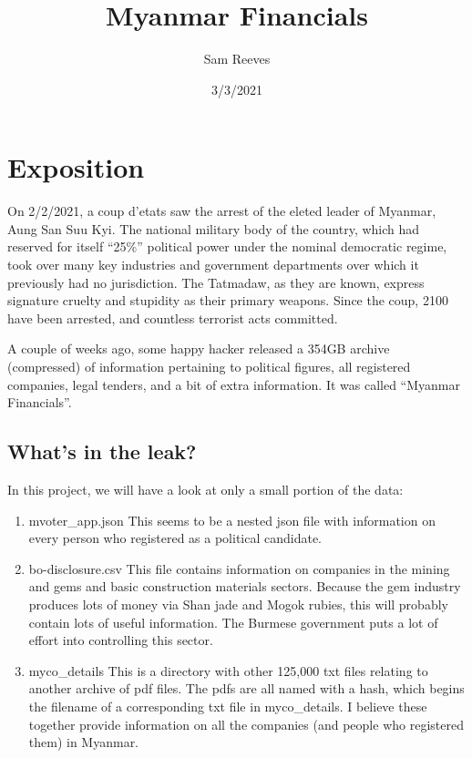 \documentclass[
]{article}
\title{Myanmar Financials}
\author{Sam Reeves}
\date{3/3/2021}
\begin{document}
\maketitle

\hypertarget{exposition}{%
\section{Exposition}\label{exposition}}

On 2/2/2021, a coup d'etats saw the arrest of the eleted leader of
Myanmar, Aung San Suu Kyi. The national military body of the country,
which had reserved for itself ``25\%'' political power under the nominal
democratic regime, took over many key industries and government
departments over which it previously had no jurisdiction. The Tatmadaw,
as they are known, express signature cruelty and stupidity as their
primary weapons. Since the coup, 2100 have been arrested, and countless
terrorist acts committed.

A couple of weeks ago, some happy hacker released a 354GB archive
(compressed) of information pertaining to political figures, all
registered companies, legal tenders, and a bit of extra information. It
was called ``Myanmar Financials''.

\hypertarget{whats-in-the-leak}{%
\subsection{What's in the leak?}\label{whats-in-the-leak}}

In this project, we will have a look at only a small portion of the
data:

\begin{enumerate}
\def\labelenumi{\arabic{enumi}.}
\item
  mvoter\_app.json This seems to be a nested json file with information
  on every person who registered as a political candidate.
\item
  bo-disclosure.csv This file contains information on companies in the
  mining and gems and basic construction materials sectors. Because the
  gem industry produces lots of money via Shan jade and Mogok rubies,
  this will probably contain lots of useful information. The Burmese
  government puts a lot of effort into controlling this sector.
\item
  myco\_details This is a directory with other 125,000 txt files
  relating to another archive of pdf files. The pdfs are all named with
  a hash, which begins the filename of a corresponding txt file in
  myco\_details. I believe these together provide information on all the
  companies (and people who registered them) in Myanmar.
\end{enumerate}
\end{document}
